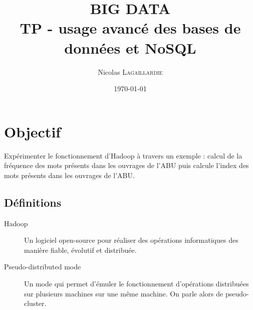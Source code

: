 \documentclass{article}
\title{BIG DATA \\ TP - usage avanc\'{e} des bases de donn\'{e}es et NoSQL} %
\author{Nicolas \textsc{Lagaillardie}} %
\date{\today} %
\begin{document}
\maketitle %




\section{Objectif}

Exp\'{e}rimenter le fonctionnement d'Hadoop \`{a} travers un exemple : calcul de la fr\'{e}quence des mots pr\'{e}sents dans les ouvrages de l'ABU puis calcule l’index des mots pr\'{e}sents dans les ouvrages de l’ABU.



\subsection{D\'{e}finitions}
\label{definitions}
\begin{description}
\item[Hadoop]
Un logiciel open-source pour r\'{e}aliser des op\'{e}rations informatiques des mani\`{e}re fiable, \'{e}volutif et distribu\'{e}e.
\item[Pseudo-distributed mode]
Un mode qui permet d'\'{e}muler le fonctionnement d'op\'{e}rations distribu\'{e}es sur plusieurs machines sur une m\^{e}me machine. On parle alors de pseudo-cluster.
\end{description} 
 
\end{document}
